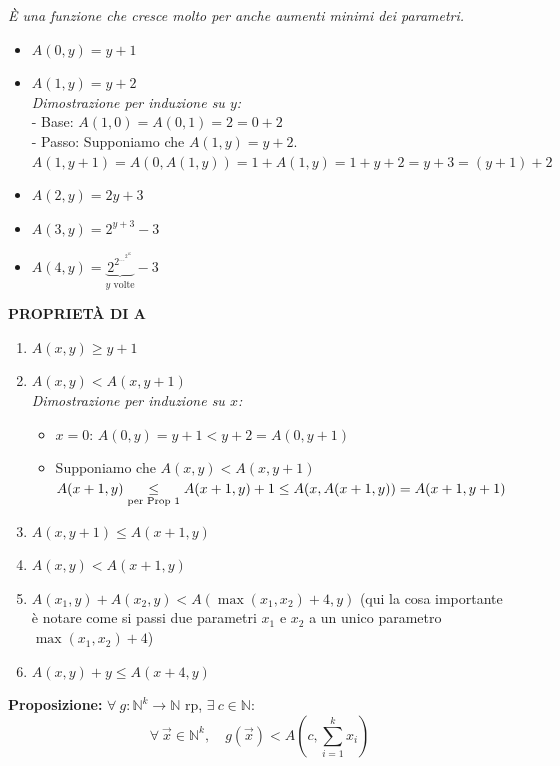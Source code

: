 \textit{È una funzione che cresce molto per anche aumenti minimi dei parametri.}

\begin{itemize}
    \item $A(0, y) = y+1$
    \item $A(1, y) = y+2$ \\
    \textit{Dimostrazione per induzione su $y$:} \\
    - Base: $A(1,0) = A(0,1) = 2 = 0+2$ \\
    - Passo: Supponiamo che $A(1,y) = y+2$. \\
    $A(1, y+1) = A(0, A(1,y)) = 1 + A(1,y) = 1 + y + 2 = y+3 = (y+1)+2$
    
    \item $A(2,y) = 2y + 3$
    \item $A(3,y) = 2^{y+3} - 3$
    \item $A(4,y) = \underbrace{2^{2^{\dots^{2^{16}}}}}_{y \text{ volte}} - 3$
\end{itemize}

\vspace{0.6cm}
\textbf{PROPRIETÀ DI A}

\begin{enumerate}
    \item $A(x,y) \ge y+1$
    \item $A(x,y) < A(x, y+1)$ \\
    \textit{Dimostrazione per induzione su $x$:}
    \begin{itemize}
        \item $x=0$: $A(0,y) = y+1 < y+2 = A(0, y+1)$
        \item Supponiamo che $A(x,y) < A(x, y+1)$ \\
        $A(x+1, y) \underset{\text{\scriptsize per Prop 1}}{\le} A(x+1, y) + 1 \le A(x, A(x+1, y)) = A(x+1, y+1)$
    \end{itemize}
    \item $A(x, y+1) \le A(x+1, y)$
    \item $A(x, y) < A(x+1, y)$
    \item $A(x_1, y) + A(x_2, y) < A(\max(x_1, x_2) + 4, y)$ (qui la cosa importante è notare come si passi due parametri $x_1$ e $x_2$ a un unico parametro $\max(x_1, x_2) + 4$)
    \item $A(x, y) + y \le A(x+4, y)$
\end{enumerate}

\vspace{0.6cm}
\textbf{Proposizione:} $\forall\ g: \mathbb{N}^k \to \mathbb{N}$ rp, $\exists\ c \in \mathbb{N} :$
$$ \forall\ \vec{x} \in \mathbb{N}^k, \quad g(\vec{x}) < A\left(c, \sum_{i=1}^{k} x_i\right) $$

